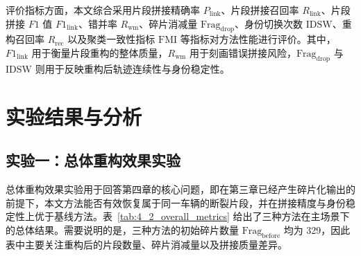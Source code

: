 \documentclass{xdupgthesis}
\begin{document}
评价指标方面，本文综合采用片段拼接精确率 $P_{\mathrm{link}}$、片段拼接召回率 $R_{\mathrm{link}}$、片段拼接 $F1$ 值 $F1_{\mathrm{link}}$、错并率 $R_{\mathrm{wm}}$、碎片消减量 $\mathrm{Frag}_{\mathrm{drop}}$、身份切换次数 $\mathrm{IDSW}$、重构召回率 $R_{\mathrm{rec}}$ 以及聚类一致性指标 $\mathrm{FMI}$ 等指标对方法性能进行评价。其中，$F1_{\mathrm{link}}$ 用于衡量片段重构的整体质量，$R_{\mathrm{wm}}$ 用于刻画错误拼接风险，$\mathrm{Frag}_{\mathrm{drop}}$ 与 $\mathrm{IDSW}$ 则用于反映重构后轨迹连续性与身份稳定性。

\section{实验结果与分析}

\subsection{实验一：总体重构效果实验}

总体重构效果实验用于回答第四章的核心问题，即在第三章已经产生碎片化输出的前提下，本文方法能否有效恢复属于同一车辆的断裂片段，并在拼接精度与身份稳定性上优于基线方法。表~\ref{tab:4_2_overall_metrics} 给出了三种方法在主场景下的总体结果。需要说明的是，三种方法的初始碎片数量 $\mathrm{Frag}_{\mathrm{before}}$ 均为 329，因此表中主要关注重构后的片段数量、碎片消减量以及拼接质量差异。

\begin{table}[H]
	\centering
	\caption{总体重构效果对比}
	\label{tab:4_2_overall_metrics}
\end{table}
\end{document}
